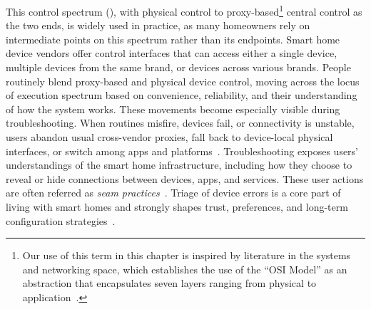 This control spectrum (), with physical control to proxy-based\footnote{Our use of this term in this chapter is inspired by literature in the systems and networking space, which establishes the use of the ``OSI Model'' as an abstraction that encapsulates seven layers ranging from physical to application~\cite{day1983osi}.} central control as the two ends, is widely used in practice, as many homeowners rely on intermediate points on this spectrum rather than its endpoints.
Smart home device vendors offer control interfaces that can access either a single device, multiple devices from the same brand, or devices across various brands. 
{People routinely blend proxy-based and physical device control, moving across the locus of execution spectrum based on convenience, reliability, and their understanding of how the system works. These movements become especially visible during troubleshooting. 
When routines misfire, devices fail, or connectivity is unstable, users abandon usual cross-vendor proxies, fall back to device-local physical interfaces, or switch among apps and platforms~\cite{duque2022troubleshooting, alam2012review}. Troubleshooting exposes users' understandings of the smart home infrastructure, including how they choose to reveal or hide connections between devices, apps, and services. These user actions are often referred as \textit{seam practices}~\cite{kuznetsov2012seams}. Triage of device errors is a core part of living with smart homes and strongly shapes trust, preferences, and long-term configuration strategies~\cite{teigen2024troubleshooting}.}

